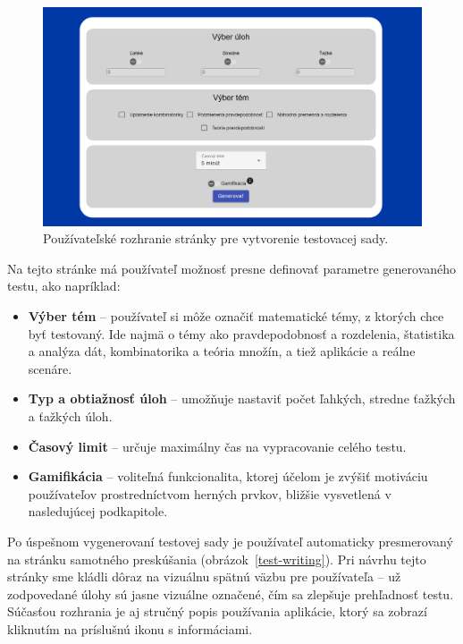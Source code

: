 \begin{figure}[h!]
  \centering
  \includegraphics[width=14cm]{img/test-creation.png}
  \caption{Používateľské rozhranie stránky pre vytvorenie testovacej sady.}
  \label{test-creation}
\end{figure}

Na tejto stránke má používateľ možnosť presne definovať parametre generovaného testu, ako napríklad:

\begin{itemize}
  \item \textbf{Výber tém} – používateľ si môže označiť matematické témy, z ktorých chce byť testovaný. Ide najmä o témy ako pravdepodobnosť a rozdelenia, štatistika a analýza dát, kombinatorika a teória množín, a tiež aplikácie a reálne scenáre.
  \item \textbf{Typ a obtiažnosť úloh} – umožňuje nastaviť počet ľahkých, stredne ťažkých a ťažkých úloh.
  \item \textbf{Časový limit} – určuje maximálny čas na vypracovanie celého testu.
  \item \textbf{Gamifikácia} – voliteľná funkcionalita, ktorej účelom je zvýšiť motiváciu používateľov prostredníctvom herných prvkov, bližšie vysvetlená v nasledujúcej podkapitole.
\end{itemize}

Po úspešnom vygenerovaní testovej sady je používateľ automaticky presmerovaný na stránku samotného preskúšania (obrázok~\ref{test-writing}). 
Pri návrhu tejto stránky sme kládli dôraz na vizuálnu spätnú väzbu pre používateľa – už zodpovedané úlohy sú jasne vizuálne označené, čím sa zlepšuje prehľadnosť testu. 
Súčasťou rozhrania je aj stručný popis používania aplikácie, ktorý sa zobrazí kliknutím na príslušnú ikonu s informáciami.

